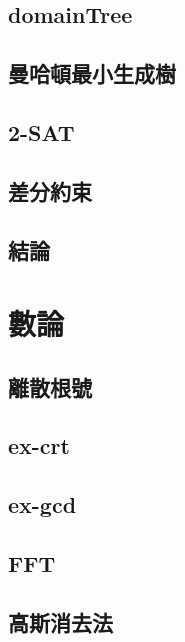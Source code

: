 \documentclass[a4paper,10pt,twocolumn,oneside]{article}
\begin{document}
\subsection{domainTree} 

\subsection{曼哈頓最小生成樹}

% 
\subsection{2-SAT}

\subsection{差分約束}

\subsection{結論}

\section{數論}
\subsection{離散根號}

\subsection{ex-crt}

\subsection{ex-gcd}

\subsection{FFT}

\subsection{高斯消去法}

\end{document}
